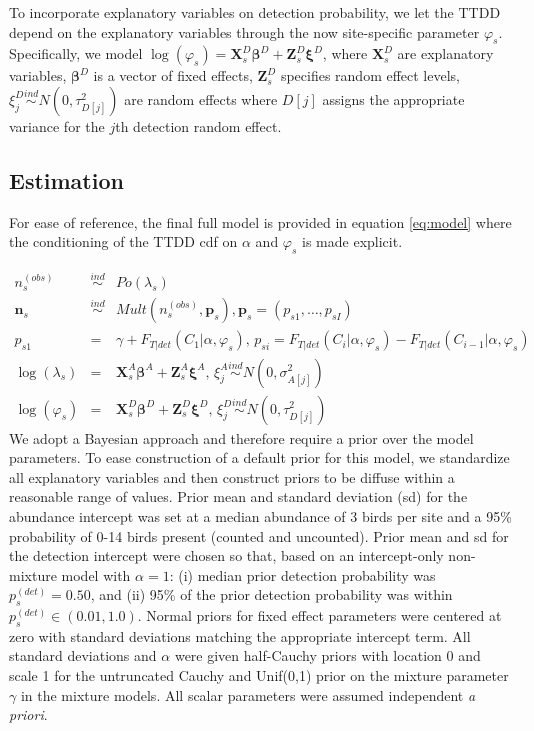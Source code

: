 \documentclass[useAMS,usenatbib,referee,12pt]{article}
\newcommand{\vn}{\textbf{n}}
\newcommand{\vp}{\textbf{p}}
\newcommand{\vX}{\textbf{X}}
\newcommand{\vZ}{\textbf{Z}}
\newcommand{\vbeta}{\boldsymbol{\beta}}
\newcommand{\vxi}{\boldsymbol{\xi}}
\newcommand{\ind}{\stackrel{ind}{\sim}}
\begin{document}
To incorporate explanatory variables on detection probability, we let the TTDD depend on the explanatory variables through the now site-specific parameter $\varphi_s$. 
Specifically, we model $\log(\varphi_{s}) = \vX_{s}^D\vbeta^D + \vZ_{s}^D\vxi^D$, where $\vX_{s}^D$ are explanatory variables, $\vbeta^D$ is a vector of fixed effects, $\vZ_{s}^D$ specifies random effect levels, $\xi_j^D \ind N(0,\tau_{D[j]}^2)$ are random effects where $D[j]$ assigns the appropriate variance for the $j$th detection random effect. 




\subsection{Estimation}

For ease of reference, the final full model is provided in equation \eqref{eq:model} where the conditioning of the TTDD cdf on $\alpha$ and $\varphi_s$ is made explicit. 

\begin{eqnarray*} 
n_s^{(obs)} &\ind& Po(\lambda_s) \\
\vn_s &\ind& Mult(n_s^{(obs)}, \vp_s), \vp_s = (p_{s1},\dots,p_{sI}) \\
p_{s1} &=& \gamma + F_{T|det}(C_1|\alpha,\varphi_s),\, p_{si} = F_{T|det}(C_i|\alpha,\varphi_s)-F_{T|det}(C_{i-1}|\alpha,\varphi_s)\\
\log(\lambda_s) &=& \vX_{s}^A\vbeta^A + \vZ_{s}^A\vxi^A,\, \xi_j^A \ind N(0,\sigma_{A[j]}^2) \\
\log(\varphi_{s}) &=& \vX_{s}^D\vbeta^D + \vZ_{s}^D\vxi^D,\, \xi_j^D \ind N(0,\tau_{D[j]}^2)
\end{eqnarray*}
We adopt a Bayesian approach and therefore require a prior over the model parameters.
To ease construction of a default prior for this model, we standardize all explanatory variables and then construct priors to be diffuse within a reasonable range of values.
Prior mean and standard deviation (sd) for the abundance intercept was set at a median abundance of 3 birds per site and a 95\% probability of 0-14 birds present (counted and uncounted).  
Prior mean and sd for the detection intercept were chosen so that, based on an intercept-only non-mixture model with $\alpha=1$: (i) median prior detection probability was $p_{s}^{(det)} = 0.50$, and (ii) 95\% of the prior detection probability was within $p_{s}^{(det)} \in (0.01, 1.0)$.  
Normal priors for fixed effect parameters were centered at zero with standard deviations matching the appropriate intercept term.  
All standard deviations and $\alpha$ were given half-Cauchy priors with location 0 and scale 1 for the untruncated Cauchy and Unif(0,1) prior on the mixture parameter $\gamma$ in the mixture models.
All scalar parameters were assumed independent \emph{a priori}. 
\end{document}
